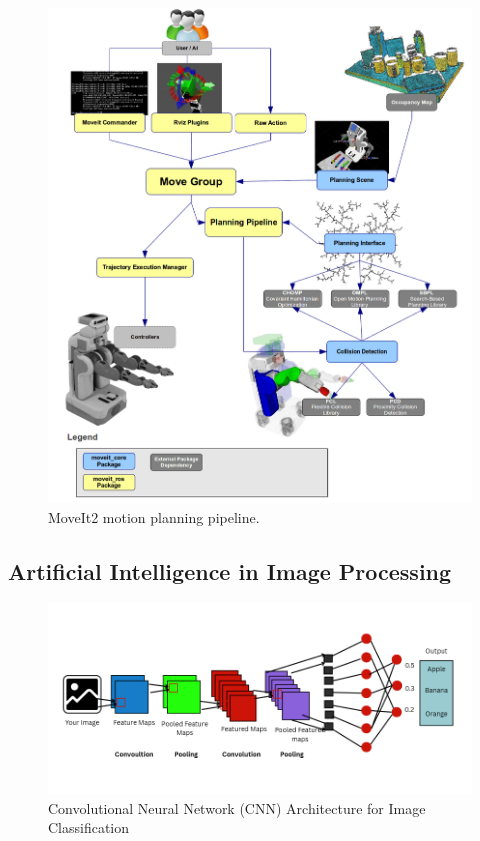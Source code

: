 \documentclass[12pt]{extarticle}
\begin{document}
\begin{figure}[htbp]
    \centering
    \includegraphics[width=\linewidth]{images/moveit_pipeline.png}
    \caption{MoveIt2 motion planning pipeline.}
    \label{fig:moveit_pipeline}
\end{figure}

\subsection{Artificial Intelligence in Image Processing}

\begin{figure}[htbp]
    \centering
    \includegraphics[width=0.8\linewidth]{images/CNN.png}
    \caption{Convolutional Neural Network (CNN) Architecture for Image Classification}
    \label{fig:cnn}
\end{figure}
\end{document}
